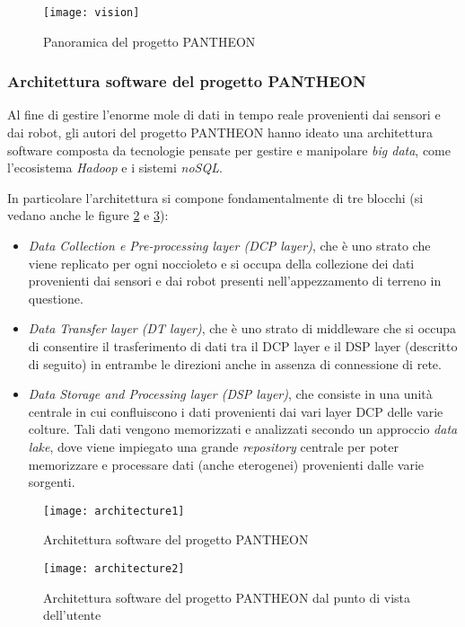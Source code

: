 \begin{figure}[ht]
\centering
\texttt{[image: vision]}
\caption{Panoramica del progetto PANTHEON}
\label{fig:vision}
\end{figure}

\subsubsection{Architettura software del progetto PANTHEON} \label{pantheon-architecture}
Al fine di gestire l'enorme mole di dati in tempo reale provenienti dai sensori e dai robot, gli autori del progetto PANTHEON hanno ideato una architettura software composta da tecnologie pensate per gestire e manipolare \textit{big data}, come l'ecosistema \textit{Hadoop} e i sistemi \textit{noSQL}.\par

In particolare l'architettura si compone fondamentalmente di tre blocchi (si vedano anche le figure \ref{fig:architecture1} e \ref{fig:architecture2}):
\begin{itemize}
  \item \textit{Data Collection e Pre-processing layer (DCP layer)}, che è uno strato che viene replicato per ogni noccioleto e si occupa della collezione dei dati provenienti dai sensori e dai robot presenti nell'appezzamento di terreno in questione.  
  \item \textit{Data Transfer layer (DT layer)}, che è uno strato di middleware che si occupa di consentire il trasferimento di dati tra il DCP layer e il DSP layer (descritto di seguito) in entrambe le direzioni anche in assenza di connessione di rete.
  \item \textit{Data Storage and Processing layer (DSP layer)}, che consiste in una unità centrale in cui confluiscono i dati provenienti dai vari layer DCP delle varie colture. Tali dati vengono memorizzati e analizzati secondo un approccio \textit{data lake}, dove viene impiegato una grande \textit{repository} centrale per poter memorizzare e processare dati (anche eterogenei) provenienti dalle varie sorgenti.
\end{itemize}

\begin{figure}[ht]
\centering
\texttt{[image: architecture1]}
\caption{Architettura software del progetto PANTHEON}
\label{fig:architecture1}
\end{figure}

\begin{figure}[ht]
\centering
\texttt{[image: architecture2]}
\caption{Architettura software del progetto PANTHEON dal punto di vista dell'utente}
\label{fig:architecture2}
\end{figure}